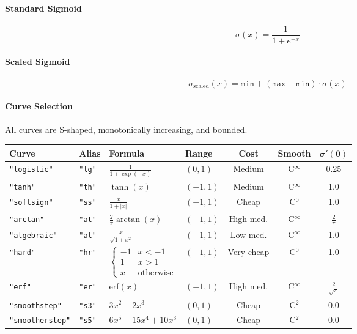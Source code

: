 \paragraph{Standard Sigmoid}
\[
\sigma(x) = \frac{1}{1 + e^{-x}}
\]

\paragraph{Scaled Sigmoid}
\[
\sigma_{\text{scaled}}(x) = \texttt{min} + (\texttt{max} - \texttt{min}) \cdot \sigma(x)
\]

\paragraph{Curve Selection}
All curves are S-shaped, monotonically increasing, and bounded.
\begin{center}
\renewcommand{\arraystretch}{1.5}
\small
\begin{tabular}{llllccc}
\textbf{Curve} & \textbf{Alias} & \textbf{Formula} & \textbf{Range} & \textbf{Cost} & \textbf{Smooth} & $\boldsymbol{\sigma'(0)}$ \\ \hline
\texttt{"logistic"} & \texttt{"lg"} & $\frac{1}{1 + \exp\left(-x\right)}$ & $(0, 1)$ & Medium & C$^\infty$ & 0.25 \\
\texttt{"tanh"} & \texttt{"th"} & $\tanh\left(x\right)$ & $(-1, 1)$ & Medium & C$^\infty$ & 1.0 \\
\texttt{"softsign"} & \texttt{"ss"} & $\frac{x}{1 + \left|x\right|}$ & $(-1, 1)$ & Cheap & C$^0$ & 1.0 \\
\texttt{"arctan"} & \texttt{"at"} & $\frac{2}{\pi} \arctan\left(x\right)$ & $(-1, 1)$ & High med. & C$^\infty$ & $\frac{2}{\pi}$ \\
\texttt{"algebraic"} & \texttt{"al"} & $\frac{x}{\sqrt{1 + x^2}}$ & $(-1, 1)$ & Low med. & C$^\infty$ & 1.0 \\
\texttt{"hard"} & \texttt{"hr"} & $\begin{cases} -1 & x < -1 \\ 1 & x > 1 \\ x & \text{otherwise} \end{cases}$ & $(-1, 1)$ & Very cheap & C$^0$ & 1.0 \\
\texttt{"erf"} & \texttt{"er"} & $\text{erf}\left(x\right)$ & $(-1, 1)$ & High med. & C$^\infty$ & $\frac{2}{\sqrt{\pi}}$ \\
\texttt{"smoothstep"} & \texttt{"s3"} & $3x^2 - 2x^3$ & $(0, 1)$ & Cheap & C$^2$ & 0.0 \\
\texttt{"smootherstep"} & \texttt{"s5"} & $6x^5 - 15x^4 + 10x^3$ & $(0, 1)$ & Cheap & C$^2$ & 0.0 \\

\end{tabular}
\end{center}
